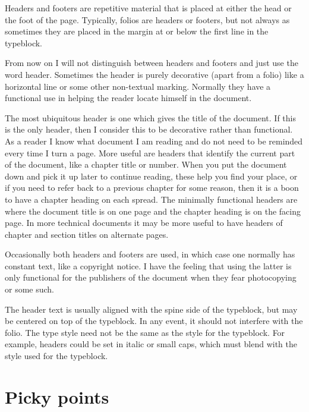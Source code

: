 \documentclass[10pt,letterpaper]{memoir}
\begin{document}
    Headers and footers are repetitive material that is placed at either 
the head or the foot of the page. Typically, folios are headers or footers,
but not always as sometimes they are placed in the margin at or below the
first line in the typeblock.

   From now on I will not distinguish between headers and footers and 
just use the word header. Sometimes the header is purely decorative (apart
from a folio) like a horizontal line or some other non-textual marking.
Normally they have a functional use in helping the reader locate himself
in the document.

    The most ubiquitous header is one which gives the title of the document.
If this is the only header, then I consider this to be decorative rather
than functional. As a reader I know what document I am reading and do not
need to be reminded every time I turn a page. More useful are headers that
identify the current part of the document, like a chapter title or number.
When you put the document down and pick it up later to continue reading, these
help you find your place, or if you need to refer back to a previous chapter
for some reason, then it is a boon to have a chapter heading 
on each 
spread. The minimally functional headers are where the document title
is on one page and the chapter heading is on the facing page. In more technical
documents it may be more useful to have headers of chapter and section titles
on alternate pages. 

    Occasionally both headers and footers are used, in which case one normally
has constant text, like a copyright notice. 
I have the feeling that using
the latter is only functional for the publishers of the document
when they fear photocopying or some such.

    The header text is usually aligned with the spine side 
of the typeblock, but may be centered on top of the typeblock. In any event,
it should not interfere with the folio. The type style need not be the same
as the style for the typeblock. For example, headers could be set in italic
or small caps, which must blend with the style used for the 
typeblock.


\chapter{Picky points}
\end{document}
